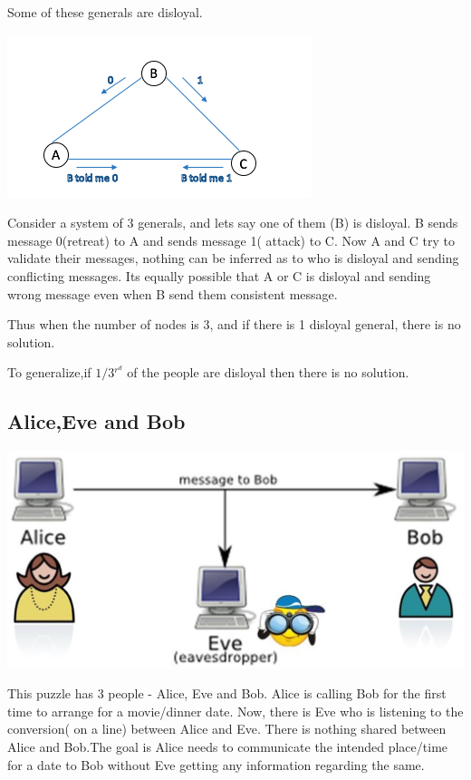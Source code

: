 \documentclass[twoside]{article}
\begin{document}
Some of these generals are disloyal.

\includegraphics[scale=0.7]{images/ABC.png}

Consider a system of 3 generals, and lets say one of them (B) is disloyal.
B sends message 0(retreat) to A and sends message 1( attack) to C. Now A and C try to validate their messages, nothing can be inferred as to who is disloyal and sending conflicting messages. Its equally possible that A or C is disloyal and sending wrong message even when B send them consistent message.

Thus when the number of nodes is 3, and if there is 1 disloyal general, there is no solution.

To generalize,if $1/3$$^r^d$ of the people are disloyal then there is no solution.

\subsection{Alice,Eve and Bob}


\includegraphics[scale=0.7]{images/Alice.png}

This puzzle has 3 people - Alice, Eve and Bob. Alice is calling Bob for the first time to arrange for a movie/dinner date. Now, there is Eve who is listening to the conversion( on a line) between Alice and Eve. There is nothing shared between Alice and Bob.The goal is Alice needs to communicate the intended place/time for a date to Bob without Eve getting any information regarding the same.
\end{document}
